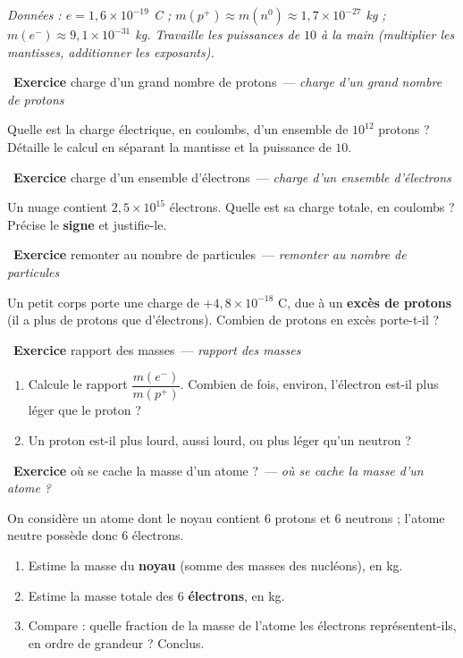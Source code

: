 \documentclass[11pt,a4paper]{article}
\newcommand{\pp}{p^{+}}
\newcommand{\ee}{e^{-}}
\newcommand{\nz}{n^{0}}
\newcounter{exo}
\newcommand{\exo}[1][]{\stepcounter{exo}\par\medskip%
  \noindent{\color{primary}\rule[-2pt]{3.5pt}{15pt}}\ \textbf{\color{primarydark}\large Exercice \theexo}%
  \ifx\relax#1\relax\relax\else\ \textmd{\normalsize\color{black!65}— \itshape #1}\fi\par\nopagebreak\smallskip}
\begin{document}

\vspace{3pt}
{\small\itshape Données : $e = 1{,}6\times10^{-19}$ C ; $m(\pp)\approx m(\nz)\approx 1{,}7\times10^{-27}$ kg ;
$m(\ee)\approx 9{,}1\times10^{-31}$ kg. Travaille les puissances de $10$ à la main (multiplier les
mantisses, additionner les exposants).}

\exo[charge d'un grand nombre de protons]
Quelle est la charge électrique, en coulombs, d'un ensemble de $10^{12}$ protons ? Détaille le calcul en
séparant la mantisse et la puissance de $10$.

\exo[charge d'un ensemble d'électrons]
Un nuage contient $2{,}5\times10^{15}$ électrons. Quelle est sa charge totale, en coulombs ? Précise le
\textbf{signe} et justifie-le.

\exo[remonter au nombre de particules]
Un petit corps porte une charge de $+4{,}8\times10^{-18}$ C, due à un \textbf{excès de protons} (il a plus
de protons que d'électrons). Combien de protons en excès porte-t-il ?

\exo[rapport des masses]
\begin{enumerate}[label=\alph*)]
  \item Calcule le rapport $\dfrac{m(\ee)}{m(\pp)}$. Combien de fois, environ, l'électron est-il plus léger
        que le proton ?
  \item Un proton est-il plus lourd, aussi lourd, ou plus léger qu'un neutron ?
\end{enumerate}

\exo[où se cache la masse d'un atome ?]
On considère un atome dont le noyau contient $6$ protons et $6$ neutrons ; l'atome neutre possède donc
$6$ électrons.
\begin{enumerate}[label=\alph*)]
  \item Estime la masse du \textbf{noyau} (somme des masses des nucléons), en kg.
  \item Estime la masse totale des $6$ \textbf{électrons}, en kg.
  \item Compare : quelle fraction de la masse de l'atome les électrons représentent-ils, en ordre de
        grandeur ? Conclus.
\end{enumerate}
\end{document}
